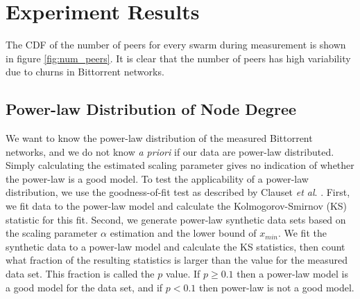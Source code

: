 \documentclass[paper]{ieice}
\begin{document}
\section{Experiment Results}\label{result}
The CDF of the number of peers for every swarm during measurement is shown in figure \ref{fig:num_peers}. 
It is clear that the number of peers has  high variability due to churns in Bittorrent networks. 

\subsection{Power-law Distribution of Node Degree}

We want to know the power-law distribution of the measured Bittorrent networks, and we do not know \textit{a priori} if our data are power-law distributed.
Simply calculating the estimated scaling parameter gives no indication of whether the power-law is a good model.  
To test the applicability of a power-law distribution, we use the goodness-of-fit test as described by Clauset \textit{et al}. \cite{clauset2009power}. 
First, we fit data to the power-law model and calculate the Kolmogorov-Smirnov (KS) statistic for this fit. 
Second, we generate power-law synthetic data sets based on the scaling parameter $\alpha$ estimation and the lower bound of $x_{min}$. 
We fit the synthetic data to a power-law model and calculate the KS statistics, then count what fraction of the resulting statistics is larger than the value for the measured data set. 
This fraction is called the $p$ value.  
If $p \geq 0.1$ then a power-law model is a good model for the data set, and if $p < 0.1$ then power-law is not a good model.
\end{document}
